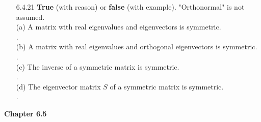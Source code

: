 \documentclass[10pt,twoside,reqno]{article}
\begin{document}
\begin{enumerate}
\vspace{3mm}
\item[6.4.21] \textbf{True} (with reason) or \textbf{false} (with example). "Orthonormal" is not assumed. \\ \vspace{2mm}
{\addtolength{\leftskip}{10mm}
(a) A matrix with real eigenvalues and eigenvectors is symmetric.\\ \vspace{2mm}
{\addtolength{\leftskip}{5mm}
. \\
}
\vspace{3mm}
(b) A matrix with real eigenvalues and orthogonal eigenvectors is symmetric.\\ \vspace{2mm}
{\addtolength{\leftskip}{5mm}
. \\
}
\vspace{3mm}
(c) The inverse of a symmetric matrix is symmetric.\\ \vspace{2mm}
{\addtolength{\leftskip}{5mm}
. \\
}
\vspace{3mm}
(d) The eigenvector matrix $S$ of a symmetric matrix is symmetric.\\ \vspace{2mm}
{\addtolength{\leftskip}{5mm}
. \\
}
\vspace{3mm}
}


\vspace{3mm}
\end{enumerate}
\vspace{5mm}
\textbf{Chapter 6.5}
\end{document}
